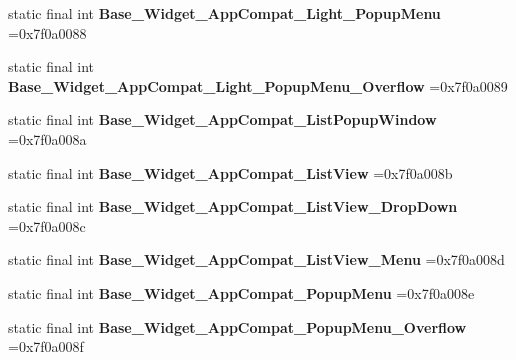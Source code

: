 \begin{DoxyCompactItemize}
static final int {\bfseries Base\+\_\+\+Widget\+\_\+\+App\+Compat\+\_\+\+Light\+\_\+\+Popup\+Menu} =0x7f0a0088
\item 
\mbox{\label{classproject4_1_1xaria_1_1R_1_1style_adfcc6ad5bb142468225ac57c448cf7c6}} 
static final int {\bfseries Base\+\_\+\+Widget\+\_\+\+App\+Compat\+\_\+\+Light\+\_\+\+Popup\+Menu\+\_\+\+Overflow} =0x7f0a0089
\item 
\mbox{\label{classproject4_1_1xaria_1_1R_1_1style_a1ab9fe7126286819c2c0f061e57592be}} 
static final int {\bfseries Base\+\_\+\+Widget\+\_\+\+App\+Compat\+\_\+\+List\+Popup\+Window} =0x7f0a008a
\item 
\mbox{\label{classproject4_1_1xaria_1_1R_1_1style_a6330784baec386d5717f70cd4e72ab43}} 
static final int {\bfseries Base\+\_\+\+Widget\+\_\+\+App\+Compat\+\_\+\+List\+View} =0x7f0a008b
\item 
\mbox{\label{classproject4_1_1xaria_1_1R_1_1style_a994b1a924ae2740509c0164d6c655ae7}} 
static final int {\bfseries Base\+\_\+\+Widget\+\_\+\+App\+Compat\+\_\+\+List\+View\+\_\+\+Drop\+Down} =0x7f0a008c
\item 
\mbox{\label{classproject4_1_1xaria_1_1R_1_1style_a0ac3080b0f072c1aed0839a368567ccc}} 
static final int {\bfseries Base\+\_\+\+Widget\+\_\+\+App\+Compat\+\_\+\+List\+View\+\_\+\+Menu} =0x7f0a008d
\item 
\mbox{\label{classproject4_1_1xaria_1_1R_1_1style_a9f43b4978006527b8ddb1178bc338db2}} 
static final int {\bfseries Base\+\_\+\+Widget\+\_\+\+App\+Compat\+\_\+\+Popup\+Menu} =0x7f0a008e
\item 
\mbox{\label{classproject4_1_1xaria_1_1R_1_1style_af72fc2fecdf4bae70515c43a6496627a}} 
static final int {\bfseries Base\+\_\+\+Widget\+\_\+\+App\+Compat\+\_\+\+Popup\+Menu\+\_\+\+Overflow} =0x7f0a008f
\item 
\mbox{\label{classproject4_1_1xaria_1_1R_1_1style_acc1cb2041ca1ddaaf7210d67e5944510}} 

\end{DoxyCompactItemize}
